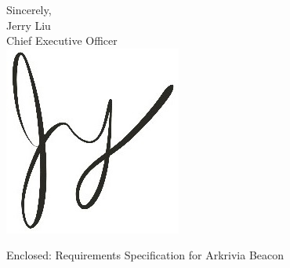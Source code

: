 \documentclass[11pt]{letter}
\begin{document}
\begin{letter}
\medskip
Sincerely,\\
Jerry Liu\\
Chief Executive Officer\\

\vspace*{-0.25cm}
\includegraphics[scale=0.8]{./images/signature.jpg}

{Enclosed: Requirements Specification for Arkrivia Beacon}

\end{letter}
\end{document}
